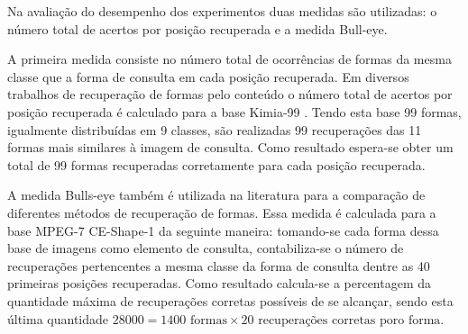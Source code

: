 Na avaliação do desempenho dos experimentos duas medidas são utilizadas: o número total de acertos por posição recuperada e a medida Bull-eye.

A primeira medida consiste no número total de ocorrências de formas da mesma classe que a forma de consulta em cada posição recuperada.  Em diversos trabalhos de recuperação de formas pelo conteúdo o número total de acertos por posição recuperada é calculado para a base Kimia-99 \cite{Bernier:2003}. Tendo esta base 99 formas, igualmente distribuídas em 9 classes, são realizadas 99 recuperações das 11 formas mais similares à imagem de consulta. Como resultado espera-se obter um total de 99 formas recuperadas corretamente para cada posição recuperada.

A medida Bulls-eye também é utilizada na literatura para a comparação de diferentes métodos de recuperação de formas. Essa medida é calculada para a base MPEG-7 CE-Shape-1 da seguinte maneira: tomando-se cada forma dessa base de imagens como elemento de consulta, contabiliza-se o número de recuperações pertencentes a mesma classe da forma de consulta dentre as 40 primeiras posições recuperadas. Como resultado calcula-se a percentagem da quantidade máxima de recuperações corretas possíveis de se alcançar, sendo esta última quantidade $28000 = 1400\text{ formas} \times 20\text{ recuperações corretas poro forma}$. 




